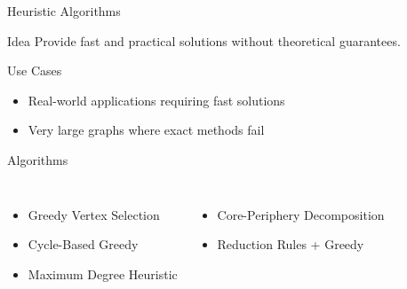 \documentclass[aspectratio=169]{beamer}
\begin{document}
\begin{frame}{Heuristic Algorithms}

\begin{block}{Idea}
Provide fast and practical solutions without theoretical guarantees.
\end{block}

\vspace{0.2cm}

\begin{exampleblock}{Use Cases}
\begin{itemize}
\item Real-world applications requiring fast solutions
\item Very large graphs where exact methods fail
\end{itemize}
\end{exampleblock}

\vspace{0.2cm}

\begin{alertblock}{Algorithms}

\begin{columns}[T]
\begin{itemize}
\item Greedy Vertex Selection
\item Cycle-Based Greedy
\item Maximum Degree Heuristic
\end{itemize}

\begin{itemize}
\item Core-Periphery Decomposition
\item Reduction Rules + Greedy
\end{itemize}

\end{columns}

\end{alertblock}

\end{frame}
\end{document}
